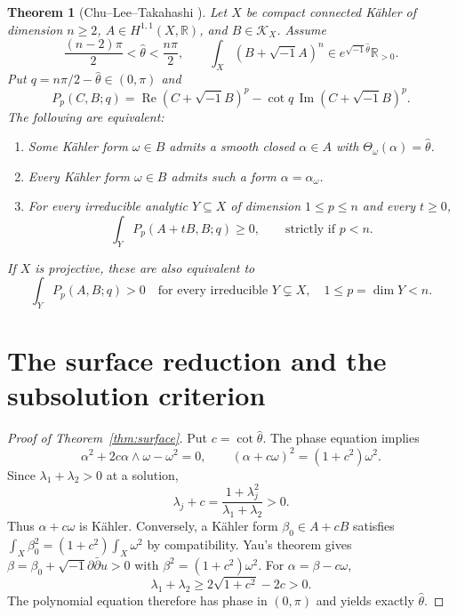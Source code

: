 \documentclass[12pt,reqno]{amsart}
\numberwithin{equation}{section}
\theoremstyle{plain}
\newtheorem{theorem}{Theorem}[section]
\theoremstyle{definition}
\theoremstyle{remark}
\newcommand{\ii}{\sqrt{-1}}
\newcommand{\ddc}{\ii\partial\bar\partial}
\newcommand{\R}{\mathbb R}
\newcommand{\Rea}{\operatorname{Re}}
\newcommand{\Ima}{\operatorname{Im}}
\begin{document}
\begin{theorem}[Chu--Lee--Takahashi \cite{CLT}]\label{thm:numerical}
Let $X$ be compact connected K\"ahler of dimension $n\ge2$,
$A\in H^{1,1}(X,\R)$, and $B\in\mathcal K_X$. Assume
\[
 \frac{(n-2)\pi}{2}<\widehat\theta<\frac{n\pi}{2},\qquad
 \int_X(B+\ii A)^n\in e^{\ii\widehat\theta}\R_{>0}.
\]
Put $q=n\pi/2-\widehat\theta\in(0,\pi)$ and
\[
 P_p(C,B;q)=\Rea(C+\ii B)^p-\cot q\,\Ima(C+\ii B)^p.
\]
The following are equivalent:
\begin{enumerate}
\item Some K\"ahler form $\omega\in B$ admits a smooth closed $\alpha\in A$ with $\Theta_\omega(\alpha)=\widehat\theta$.
\item Every K\"ahler form $\omega\in B$ admits such a form $\alpha=\alpha_\omega$.
\item For every irreducible analytic $Y\subseteq X$ of dimension $1\le p\le n$ and every $t\ge0$,
\[
 \int_Y P_p(A+tB,B;q)\ge0,
 \qquad\text{strictly if }p<n.
\]
\end{enumerate}
If $X$ is projective, these are also equivalent to
\[
 \int_Y P_p(A,B;q)>0
 \quad\text{for every irreducible }Y\subsetneq X,
 \quad 1\le p=\dim Y<n.
\]
\end{theorem}

\section{The surface reduction and the subsolution criterion}\label{sec:analytic}
\begin{proof}[Proof of Theorem~\ref{thm:surface}]\label{proof:surface}
Put $c=\cot\widehat\theta$. The phase equation implies
\[
 \alpha^2+2c\alpha\wedge\omega-\omega^2=0,
 \qquad (\alpha+c\omega)^2=(1+c^2)\omega^2.
\]
Since $\lambda_1+\lambda_2>0$ at a solution,
\[
 \lambda_j+c=\frac{1+\lambda_j^2}{\lambda_1+\lambda_2}>0.
\]
Thus $\alpha+c\omega$ is K\"ahler. Conversely, a K\"ahler form
$\beta_0\in A+cB$ satisfies
$\int_X\beta_0^2=(1+c^2)\int_X\omega^2$ by compatibility.
Yau's theorem \cite{Yau} gives $\beta=\beta_0+\ddc u>0$ with
$\beta^2=(1+c^2)\omega^2$. For $\alpha=\beta-c\omega$,
\[
 \lambda_1+\lambda_2\ge2\sqrt{1+c^2}-2c>0.
\]
The polynomial equation therefore has phase in $(0,\pi)$ and yields exactly $\widehat\theta$.
\end{proof}
\end{document}
